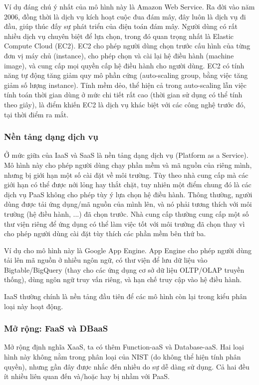 \documentclass{article}
\begin{document}
Ví dụ đáng chú ý nhất của mô hình này là Amazon Web Service. Ra đời vào năm
2006, đồng thời là dịch vụ kích hoạt cuộc đua đám mây, đây luôn là dịch vụ đi
đầu, giúp thúc đấy sự phát triển của điện toán đám mây. Người dùng có rất nhiều
dịch vụ chuyên biệt để lựa chọn, trong đó quan trọng nhất là Elastic Compute
Cloud (EC2). EC2 cho phép người dùng chọn trước cấu hình của từng đơn vị máy chủ
(instance), cho phép chọn và cài lại hệ điều hành (machine image), và cung cấp
mọi quyền cấp hệ điều hành cho người dùng. EC2 có tính năng tự động tăng giảm
quy mô phần cứng (auto-scaling group, bằng việc tăng giảm số lượng instance).
Tính mềm dẻo, thể hiện cả trong auto-scaling lẫn việc tính toán thời gian dùng ở
mức chi tiết rất cao (thời gian sử dụng có thể tính theo giây), là điểm khiến
EC2 là dịch vụ khác biệt với các công nghệ trước đó, tại thời điểm ra mắt.

\subsubsection{Nền tảng dạng dịch vụ}

Ở mức giữa của IaaS và SaaS là nền tảng dạng dịch vụ (Platform as a Service). Mô
hình này cho phép người dùng chạy phần mềm và mã nguồn của riêng mình, nhưng bị
giới hạn một số cài đặt về môi trường. Tùy theo nhà cung cấp mà các giới hạn có
thể được nới lỏng hay thắt chặt, tuy nhiên một điểm chung đó là các dịch vụ PaaS
không cho phép tùy ý lựa chọn hệ điều hành. Thông thường, người dùng được tải
ứng dụng/mã nguồn của mình lên, và nó phải tương thích với môi trường (hệ điều
hành, ...) đã chọn trước. Nhà cung cấp thường cung cấp một số thư viện riêng để
ứng dụng có thể làm việc tốt với môi trường đã chọn thay vì cho phép người dùng
cài đặt tùy thích các phần mềm bên thứ ba.

Ví dụ cho mô hình này là Google App Engine. App Engine cho phép người dùng tải
lên mã nguồn ở nhiều ngôn ngữ, có thư viện để lưu dữ liệu vào Bigtable/BigQuery
(thay cho các ứng dụng cơ sở dữ liệu OLTP/OLAP truyền thống), dùng ngôn ngữ truy
vấn riêng, và hạn chế truy cập vào hệ điều hành.

IaaS thường chính là nền tảng đầu tiên để các mô hình còn lại trong kiểu phân
loại này hoạt động.

\subsubsection{Mở rộng: FaaS và DBaaS}

Mở rộng định nghĩa XaaS, ta có thêm Function-aaS và Database-aaS. Hai loại hình
này không nằm trong phân loại của NIST (do không thể hiện tính phân quyền),
nhưng gần đây được nhắc đến nhiều do sự dễ dàng sử dụng. Cả hai đều ít nhiều
liên quan đến và/hoặc hay bị nhầm với PaaS.
\end{document}
